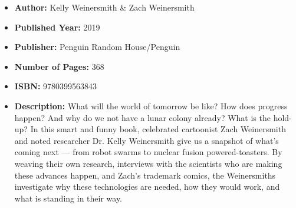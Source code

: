 \documentclass{tufte-handout}
\begin{document}
\begin{itemize}
    \item[] \textbf{Author:} Kelly Weinersmith \& Zach Weinersmith 
    \item[] \textbf{Published Year:} 2019
    \item[] \textbf{Publisher:} Penguin Random House/Penguin
    \item[] \textbf{Number of Pages:} 368      
    \item[] \textbf{ISBN:} 9780399563843
    \item[] \textbf{Description:} What will the world of tomorrow be like? How does progress happen? And why do we not have a lunar colony already? What is the hold-up? In this smart and funny book, celebrated cartoonist Zach Weinersmith and noted researcher Dr. Kelly Weinersmith give us a snapshot of what’s coming next --- from robot swarms to nuclear fusion powered-toasters. By weaving their own research, interviews with the scientists who are making these advances happen, and Zach’s trademark comics, the Weinersmiths investigate why these technologies are needed, how they would work, and what is standing in their way.
\end{itemize}
\end{document}
